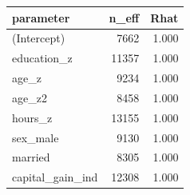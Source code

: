 \begin{tabular}{lrr}
  \hline
parameter & n\_eff & Rhat \\ 
  \hline
(Intercept) & 7662 & 1.000 \\ 
  education\_z & 11357 & 1.000 \\ 
  age\_z & 9234 & 1.000 \\ 
  age\_z2 & 8458 & 1.000 \\ 
  hours\_z & 13155 & 1.000 \\ 
  sex\_male & 9130 & 1.000 \\ 
  married & 8305 & 1.000 \\ 
  capital\_gain\_ind & 12308 & 1.000 \\ 
   \hline
\end{tabular}
